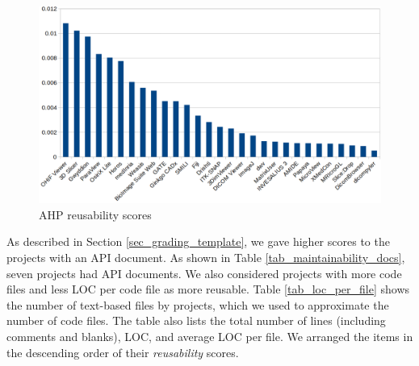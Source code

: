 \begin{figure}[H]
\includegraphics[scale=0.38]{figures/reusability_scores.png}
\caption{AHP reusability scores}
\label{fg_reusability_scores}
\end{figure}

As described in Section \ref{sec_grading_template}, we gave higher scores to the projects with an API document. As shown in Table \ref{tab_maintainability_docs}, seven projects had API documents. We also considered projects with more code files and less LOC per code file as more reusable. Table \ref{tab_loc_per_file} shows the number of text-based files by projects, which we used to approximate the number of code files. The table also lists the total number of lines (including comments and blanks), LOC, and average LOC per file. We arranged the items in the descending order of their \textit{reusability} scores. 

